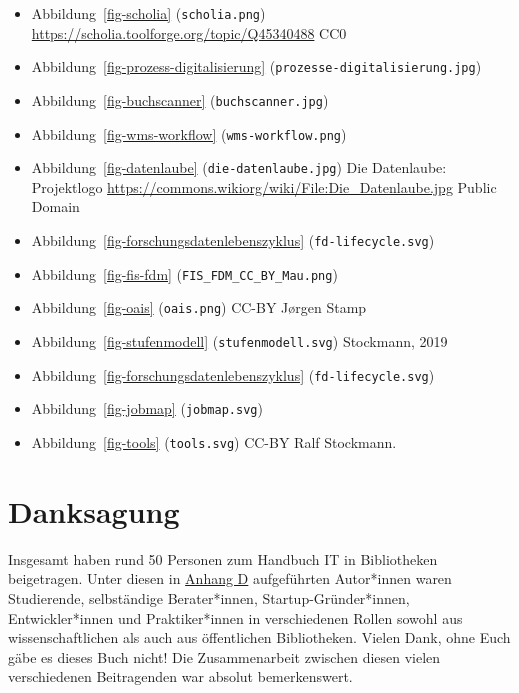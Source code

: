 \documentclass[
  11pt,
  letterpaper,
  DIV=11,
  twoside]{scrreprt}
\begin{document}
\begin{itemize}
  Abbildung~\ref{fig-vufind} (\texttt{vufind.png}) Quelle:
  \url{https://core.coll.mpg.de/}
\item
  Abbildung~\ref{fig-scholia} (\texttt{scholia.png})
  \url{https://scholia.toolforge.org/topic/Q45340488} CC0
\item
  Abbildung~\ref{fig-prozess-digitalisierung}
  (\texttt{prozesse-digitalisierung.jpg})
\item
  Abbildung~\ref{fig-buchscanner} (\texttt{buchscanner.jpg})
\item
  Abbildung~\ref{fig-wms-workflow} (\texttt{wms-workflow.png})
\item
  Abbildung~\ref{fig-datenlaube} (\texttt{die-datenlaube.jpg}) Die
  Datenlaube: Projektlogo
  \url{https://commons.wikiorg/wiki/File:Die_Datenlaube.jpg} Public
  Domain
\item
  Abbildung~\ref{fig-forschungsdatenlebenszyklus}
  (\texttt{fd-lifecycle.svg})
\item
  Abbildung~\ref{fig-fis-fdm} (\texttt{FIS\_FDM\_CC\_BY\_Mau.png})
\item
  Abbildung~\ref{fig-oais} (\texttt{oais.png}) CC-BY Jørgen Stamp
\item
  Abbildung~\ref{fig-stufenmodell} (\texttt{stufenmodell.svg})
  Stockmann, 2019
\item
  Abbildung~\ref{fig-forschungsdatenlebenszyklus}
  (\texttt{fd-lifecycle.svg})
\item
  Abbildung~\ref{fig-jobmap} (\texttt{jobmap.svg})
\item
  Abbildung~\ref{fig-tools} (\texttt{tools.svg}) CC-BY Ralf Stockmann.
\end{itemize}

\chapter{Danksagung}\label{sec-danksagung}

Insgesamt haben rund 50 Personen zum Handbuch IT in Bibliotheken
beigetragen. Unter diesen in \hyperref[sec-contributors]{Anhang D}
aufgeführten Autor*innen waren Studierende, selbständige Berater*innen,
Startup-Gründer*innen, Entwickler*innen und Praktiker*innen in
verschiedenen Rollen sowohl aus wissenschaftlichen als auch aus
öffentlichen Bibliotheken. Vielen Dank, ohne Euch gäbe es dieses Buch
nicht! Die Zusammenarbeit zwischen diesen vielen verschiedenen
Beitragenden war absolut bemerkenswert.
\end{document}
